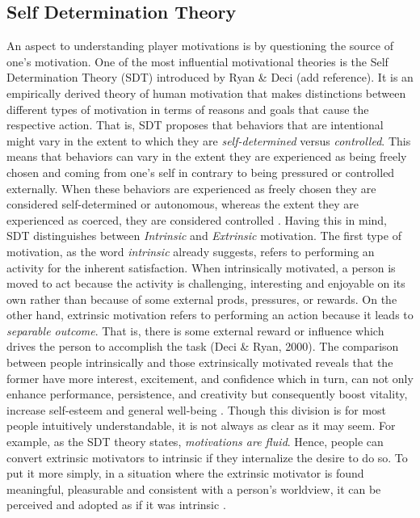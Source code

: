 \subsection{Self Determination Theory}
An aspect to understanding player motivations is by questioning the source of one's motivation. One of the most influential motivational theories is the Self Determination Theory (SDT) introduced by Ryan \& Deci (add reference). It is an empirically derived theory of human motivation that makes distinctions between different types of motivation in terms of reasons and goals that cause the respective action. That is, SDT proposes that behaviors that are intentional might vary in the extent to which they are \textit{self-determined} versus \textit{controlled}. This means that behaviors can vary in the extent they are experienced as being freely chosen and coming from one's self in contrary to being pressured or controlled externally. When these behaviors are experienced as freely chosen they are considered self-determined or autonomous, whereas the extent they are experienced as coerced, they are considered controlled \cite{deci1994promoting}. Having this in mind, SDT distinguishes between \textit{Intrinsic} and \textit{Extrinsic} motivation. The first type of motivation, as the word \textit{intrinsic} already suggests, refers to performing an activity for the inherent satisfaction. When intrinsically motivated, a person is moved to act because the activity is challenging, interesting and enjoyable on its own rather than because of some external prods, pressures, or rewards. On the other hand, extrinsic motivation refers to performing an action because it leads to \textit{separable outcome}. That is, there is some external reward or influence which drives the person to accomplish the task (Deci  \& Ryan, 2000). The comparison between people intrinsically and those extrinsically motivated reveals that the former have more interest, excitement, and confidence which in turn, can not only enhance performance, persistence, and creativity but consequently boost vitality, increase self-esteem and general well-being \cite{ryan2000self}. Though this division is for most people intuitively understandable, it is not always as clear as it may seem. For example, as the SDT theory states, \textit{motivations are fluid}. Hence, people can convert extrinsic motivators to intrinsic if they internalize the desire to do so. To put it more simply, in a situation where the extrinsic motivator is found meaningful, pleasurable and consistent with a person's worldview, it can be perceived and adopted as if it was intrinsic \cite{zichermann2012}.
